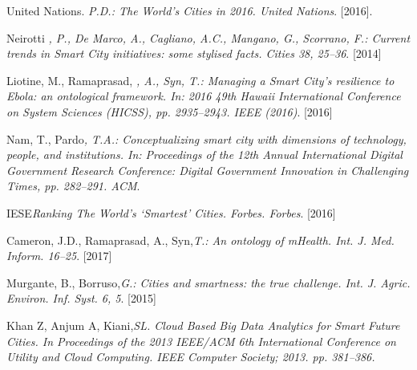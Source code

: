 \documentclass[french, a4paper, 12pt]{report}
\begin{document}
% 
%  
{} 
\begin{thebibliography}{9}
United Nations. \emph{P.D.: The World’s Cities in 2016. United Nations}. [2016].

 Neirotti \emph{, P., De Marco, A., Cagliano, A.C., Mangano, G., Scorrano, F.: Current trends in Smart City initiatives: some stylised facts. Cities 38, 25–36}. [2014]


  Liotine, M., Ramaprasad, \emph{, A., Syn, T.: Managing a Smart City’s resilience to Ebola: an ontological framework. In: 2016 49th Hawaii International Conference on System Sciences (HICSS), pp. 2935–2943. IEEE (2016)}. [2016]

 Nam, T., Pardo\emph{, T.A.: Conceptualizing smart city with dimensions of technology, people, and institutions. In: Proceedings of the 12th Annual International Digital Government Research Conference: Digital Government Innovation in Challenging Times, pp. 282–291. ACM}.

IESE\emph{Ranking The World’s ‘Smartest’ Cities. Forbes. Forbes}. [2016]

Cameron, J.D., Ramaprasad, A., Syn,\emph{T.: An ontology of mHealth. Int. J. Med. Inform. 16–25}. [2017]

 Murgante, B., Borruso,\emph{G.: Cities and smartness: the true challenge. Int. J. Agric. Environ. Inf. Syst. 6, 5}. [2015]

Khan Z, Anjum A, Kiani,\emph{SL. Cloud Based Big Data Analytics for Smart Future Cities. In Proceedings of the 2013 IEEE/ACM 6th International Conference on Utility and Cloud Computing. IEEE Computer Society; 2013. pp. 381–386.}



\end{thebibliography}
\end{document}

